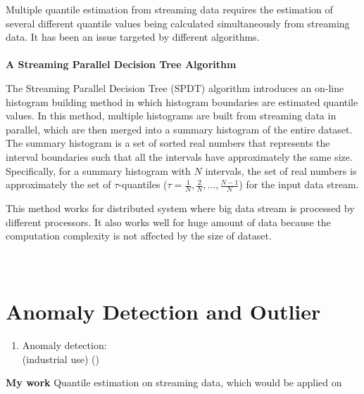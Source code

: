 \documentclass[12pt]{article}
\begin{document}
\begin{enumerate}
        Multiple quantile estimation from streaming data requires the estimation of several different quantile values being calculated simultaneously from streaming data. It has been an issue targeted by different algorithms.\\\\

        \cite{ben-haimStreamingParallelDecision} 
        \textbf{A Streaming Parallel Decision Tree Algorithm}

        The Streaming Parallel Decision Tree (SPDT) algorithm \cite{ben-haimStreamingParallelDecision} introduces an on-line histogram building method %
        in which histogram boundaries are estimated quantile values.
        In this method, multiple histograms are built from streaming data in parallel, which are then merged into a summary histogram of the entire dataset. The summary histogram is a set of sorted real numbers that represents the interval boundaries such that all the intervals have approximately the same size. Specifically, for a summary histogram with $N$ intervals, the set of real numbers is approximately the set of $\tau$-quantiles ($\tau = \frac{1}{N}, \frac{2}{N}, ..., \frac{N-1}{N}$) for the input data stream.

        This method works for distributed system where big data stream is processed by different processors. It also works well for huge amount of data because the computation complexity is not affected by the size of dataset.
        \\\\
        \cite{pebayFormulasRobustOnepass2008}\\

\end{enumerate}

\section{Anomaly Detection and Outlier}

\begin{enumerate}
    \item Anomaly detection: \\
        \cite{emmottMetaAnalysisAnomalyDetection2015}
        (industrial use)
        ()
\end{enumerate}
\newpage
\textbf{My work} Quantile estimation on streaming data, which would be applied on 

\newpage


\end{document}

